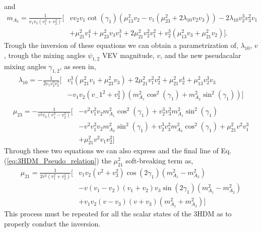 %
and 
%
\begin{equation}
\begin{split}
m_{A_2} = \frac{1}{v_1 v_2 \left(v_1^2+v_2^2\right)} \Bigg[ & v v_2 v_1 \cot \left(\gamma _1\right) \left(\mu _{13}^2 v_2-v_1 \left(\mu _{23}^2+2 \lambda _{10} v_2 v_3\right)\right)-2 \lambda_{10} v_2^3 v_3^2 v_1 \\ & +\mu _{21}^2 v_1^4+\mu _{23}^2 v_3 v_1^3+2 \mu_{21}^2 v_2^2 v_1^2+v_2^3 \left(\mu _{13}^2 v_3+\mu _{21}^2 v_2\right) \Bigg].
\end{split} 
\end{equation} 
%
Trough the inversion of these equations we can obtain a parametrization of, $\lambda_{10}$, $v$, trough the mixing angles $\psi_{1,2}$ VEV magnitude, $v$, and the new pseudacalar mixing angles $\gamma_{1,2}$, as seen in,
%
\begin{equation}
\begin{split}
\lambda_{10} = - \frac{1}{2 v_1 v_2^3 v_3^2}  \Bigg[ & v_1^3 \left(\mu_{21}^2 v_1+\mu_{23}^2 v_3 \right) +2 \mu_{21}^2 v_1^2 v_2^2 + \mu_{21}^2 v_2^4 +\mu_{13}^2 v_2^3 v_3 \\ & - v_1 v_2 \left( v_-1^2 + v_2^2 \right) \left(m_{A_1}^2 \cos^2\left(\gamma _1\right)+m_{A_2}^2 \sin ^2\left(\gamma _1\right)\right) \Bigg] \\
\end{split}
\end{equation}
%
\begin{equation}
\begin{split}
\mu_{23} = -\frac{1}{v^2 v_3 \left(v_1^2-v_2^2\right)} \Bigg[  & -v^2 v_1^2 v_2 m_{A_1}^2 \cos ^2\left(\gamma _1\right)+v_2^3 v_3^2 m_{A_1}^2 \sin ^2\left(\gamma _1\right) \\ & - v^2 v_1^2 v_2 m_{A_2}^2 \sin^2\left(\gamma _1\right)  +v_2^3 v_3^2 m_{A_2}^2\cos^2\left(\gamma _1\right)+\mu_{21}^2 v^2 v_1^3 \\ & + \mu_{21}^2 v^2 v_1 v_2^2 \Bigg] 
\end{split}
\end{equation}
Through these two equations we can also express and the final line of Eq.\,(\ref{eq:3HDM_Pseudo_relation}) the $\mu_{21}^2$ soft-breaking term as, 
\begin{equation}
\begin{split} 
\mu_{21}  = \frac{1}{2 v^2 \left(v_1^2+v_2^2\right)} \Bigg[& v_1 v_2 \left(v^2+v_3^2\right) \cos \left(2 \gamma _1\right) \left(m_{A_1}^2-m_{A_2}^2\right) \\ & - v \left(v_1-v_2\right) \left(v_1+v_2\right) v_3 \sin \left(2 \gamma _1\right) 
   \left(m_{A_1}^2-m_{A_2}^2\right) \\ & +v_1 v_2 \left(v-v_3\right) \left(v+v_3\right) \left(m_{A_1}^2+m_{A_2}^2\right) \Bigg] 
\end{split}
\end{equation}
%
This process must be repeated for all the scalar states of the 3HDM as to properly conduct the inversion. 
%

